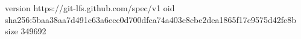 version https://git-lfs.github.com/spec/v1
oid sha256:5baa38aa7d491c63a6ecc0d700dfca74a403c8cbe2dea1865f17c9575d42fe8b
size 349692
